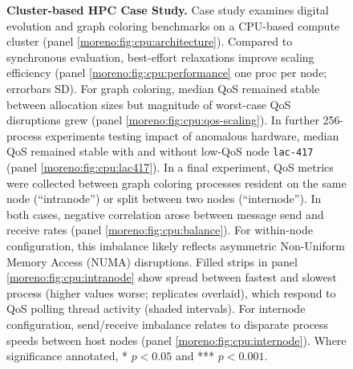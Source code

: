 \begin{figure}
\caption{
\textbf{Cluster-based HPC Case Study.}
\footnotesize
Case study examines digital evolution and graph coloring benchmarks on a CPU-based compute cluster (panel \ref{moreno:fig:cpu:architecture}).
Compared to synchronous evaluation, best-effort relaxations improve scaling efficiency (panel \ref{moreno:fig:cpu:performance} one proc per node; errorbars SD).
For graph coloring, median QoS remained stable between allocation sizes but magnitude of worst-case QoS disruptions grew (panel \ref{moreno:fig:cpu:qos-scaling}).
In further 256-process experiments testing impact of anomalous hardware, median QoS remained stable with and without low-QoS node \texttt{lac-417} (panel \ref{moreno:fig:cpu:lac417}).
In a final experiment, QoS metrics were collected between graph coloring processes resident on the same node (``intranode'') or split between two nodes (``internode'').
In both cases, negative correlation arose between message send and receive rates (panel \ref{moreno:fig:cpu:balance}).
For within-node configuration, this imbalance likely reflects asymmetric Non-Uniform Memory Access (NUMA) disruptions.
Filled strips in panel \ref{moreno:fig:cpu:intranode} show spread between fastest and slowest process (higher values worse; replicates overlaid), which respond to QoS polling thread activity (shaded intervals).
For internode configuration, send/receive imbalance relates to disparate process speeds between host nodes (panel \ref{moreno:fig:cpu:internode}).
Where significance annotated, * $p<0.05$ and *** $p < 0.001$.
}
\label{moreno:fig:cpu}
\end{figure}
